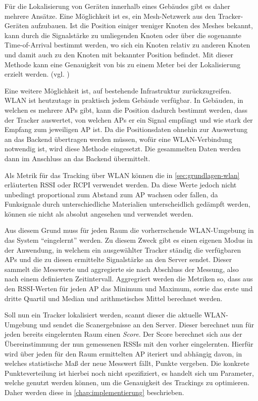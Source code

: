 Für die Lokalisierung von Geräten innerhalb eines Gebäudes gibt es daher mehrere Ansätze.
Eine Möglichkeit ist es, ein Mesh-Netzwerk aus den Tracker-Geräten aufzubauen. Ist die Position
einiger weniger Knoten des Meshes bekannt, kann durch die Signalstärke zu umliegenden Knoten oder
über die sogenannte Time-of-Arrival bestimmt werden, wo sich ein Knoten relativ zu anderen Knoten
und damit auch zu den Knoten mit bekannter Position befindet.
Mit dieser Methode kann eine Genauigkeit von bis zu einem Meter bei der Lokalisierung erzielt
werden. (vgl. \cite{Patwari2003})

Eine weitere Möglichkeit ist, auf bestehende Infrastruktur zurückzugreifen. \Gls{WLAN} ist
heutzutage in praktisch jedem Gebäude verfügbar.
In Gebäuden, in welchen es mehrere \glspl{AP} gibt, kann die Position dadurch bestimmt werden,
dass der Tracker auswertet, von welchen \glspl{AP} er ein Signal empfängt und wie stark der
Empfang zum jeweiligen \gls{AP} ist.
Da die Positionsdaten ohnehin zur Auswertung an das Backend übertragen werden müssen, wofür eine
\gls{WLAN}-Verbindung notwendig ist, wird diese Methode eingesetzt.
Die gesammelten Daten werden dann im Anschluss an das Backend übermittelt.

Als Metrik für das Tracking über \gls{WLAN} können die in \autoref{sec:grundlagen-wlan} erläuterten
\gls{RSSI} oder \gls{RCPI} verwendet werden. Da diese Werte jedoch nicht unbedingt proportional zum
Abstand zum \gls{AP} wachsen oder fallen, da Funksignale durch unterschiedliche Materialien
unterscheidlich gedämpft werden, können sie nicht als absolut angesehen und verwendet werden.

Aus diesem Grund muss für jeden Raum die vorherrschende \gls{WLAN}-Umgebung in das System
\enquote{eingelernt} werden. Zu diesem Zweck gibt es einen eigenen Modus in der Anwendung, in
welchem ein ausgewählter Tracker ständig die verfügbaren \glspl{AP} und die zu diesen ermittelte
Signalstärke an den Server sendet. Dieser sammelt die Messwerte und aggregierte sie nach Abschluss
der Messung, also nach einem definierten Zeitintervall. Aggregriert werden die Metriken so, dass aus
den \gls{RSSI}-Werten für jeden \gls{AP} das Minimum und Maximum, sowie das erste und dritte Quartil
und Median und arithmetisches Mittel berechnet werden.

Soll nun ein Tracker lokalisiert werden, scannt dieser die aktuelle \gls{WLAN}-Umgebung und sendet
die Scanergebnisse an den Server. Dieser berechnet nun für jeden bereits eingelernten Raum einen
\textit{Score}. Der Score berechnet sich aus der Übereinstimmung der nun gemessenen \glspl{RSSI} mit
den vorher eingelernten. Hierfür wird über jeden für den Raum ermittelten \gls{AP} iteriert und
abhängig davon, in welches statistische Maß der neue Messwert fällt, Punkte vergeben. Die konkrete
Punkteverteilung ist hierbei noch nicht spezifiziert, es handelt sich um Parameter, welche genutzt
werden können, um die Genauigkeit des Trackings zu optimieren. Daher werden diese in
\autoref{chap:implementierung} beschrieben.

